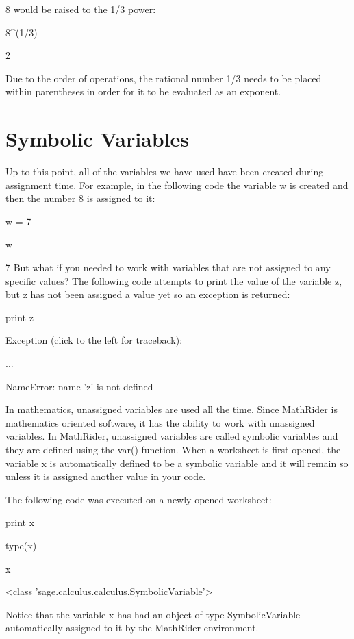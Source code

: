 \documentclass[12pt,oneside]{book}
\begin{document}
8 would be raised to the 1/3 power:

8\^{}(1/3)

{\textbar}

2


Due to the order of operations, the rational number 1/3 needs to be placed within parentheses in order for it to be evaluated as an exponent.

\section[Symbolic Variables]{Symbolic Variables}

Up to this point, all of the variables we have used have been created during assignment time. For example, in the following code the variable w is created and then the number 8 is assigned to it: 

w = 7

w

{\textbar}

7
But what if you needed to work with variables that are not assigned to any specific values? The following code attempts to print the value of the variable z, but z has not been assigned a value yet so an exception is returned: 

print z

{\textbar}

Exception (click to the left for traceback):

...

NameError: name 'z' is not defined


In mathematics, {\textquotedbl}unassigned variables{\textquotedbl} are used all the time. Since MathRider is mathematics oriented software, it has the ability to work with unassigned variables. In MathRider, unassigned variables are called symbolic variables and they are defined using the var() function. When a worksheet is first opened, the variable x is automatically defined to be a symbolic variable and it will remain so unless it is assigned another value in your code. 

The following code was executed on a newly{}-opened worksheet:


print x

type(x)

{\textbar}

x

{\textless}class 'sage.calculus.calculus.SymbolicVariable'{\textgreater}

Notice that the variable x has had an object of type SymbolicVariable automatically assigned to it by the MathRider environment. 
\end{document}
